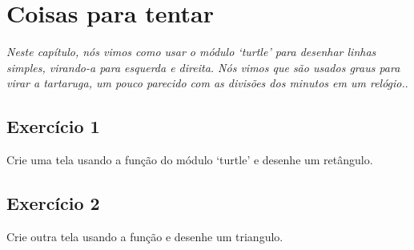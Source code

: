 \section{Coisas para tentar}

\emph{Neste capítulo, nós vimos como usar o módulo `turtle' para desenhar linhas simples, virando-a para esquerda e direita. Nós vimos que são usados graus para virar a tartaruga, um pouco parecido com as divisões dos minutos em um relógio.}.

\subsection*{Exercício 1}
Crie uma tela usando a função  do módulo `turtle' e desenhe um retângulo.

\subsection*{Exercício 2}
Crie outra tela usando a função  e desenhe um triangulo.

\newpage
